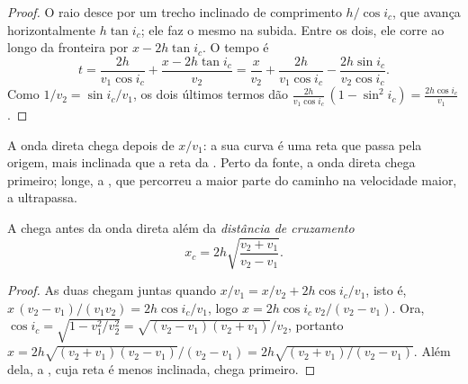 \begin{proof}
O raio desce por um trecho inclinado de comprimento $h/\cos i_c$, que avança
horizontalmente $h\tan i_c$; ele faz o mesmo na subida. Entre os dois, ele
corre ao longo da fronteira por $x - 2h\tan i_c$. O tempo é
\[
  t = \frac{2h}{v_1\cos i_c} + \frac{x - 2h\tan i_c}{v_2}
    = \frac{x}{v_2} + \frac{2h}{v_1\cos i_c} - \frac{2h\sin i_c}{v_2\cos i_c}.
\]
Como $1/v_2 = \sin i_c/v_1$, os dois últimos termos dão
$\frac{2h}{v_1\cos i_c}\,(1 - \sin^2 i_c) = \frac{2h\cos i_c}{v_1}$.
\end{proof}

A onda direta chega depois de $x/v_1$: a sua curva é uma reta que passa
pela origem, mais inclinada que a reta da . Perto da fonte, a
onda direta chega primeiro; longe, a , que percorreu a maior
parte do caminho na velocidade maior, a ultrapassa.

\begin{proposition}\label{prop:g11:seismic-structure:crossover}
A  chega antes da onda direta além da \emph{distância de
cruzamento}
\[
  x_c = 2h\sqrt{\frac{v_2 + v_1}{v_2 - v_1}}.
\]
\end{proposition}

\begin{proof}
As duas chegam juntas quando $x/v_1 = x/v_2 + 2h\cos i_c/v_1$, isto é,
$x\,(v_2 - v_1)/(v_1 v_2) = 2h\cos i_c/v_1$, logo $x = 2h\cos i_c\,v_2/(v_2 -
v_1)$. Ora, $\cos i_c = \sqrt{1 - v_1^2/v_2^2} = \sqrt{(v_2 - v_1)(v_2 +
v_1)}/v_2$, portanto $x = 2h\sqrt{(v_2 + v_1)(v_2 - v_1)}/(v_2 - v_1) =
2h\sqrt{(v_2 + v_1)/(v_2 - v_1)}$. Além dela, a , cuja reta é
menos inclinada, chega primeiro.
\end{proof}

